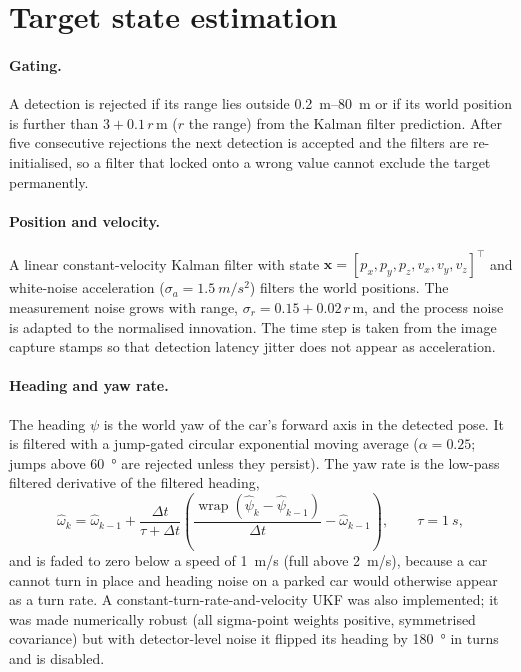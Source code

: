 \documentclass[11pt,a4paper]{report}
\begin{document}
\section{Target state estimation}
\label{sec:estimation}

\paragraph{Gating.}
A detection is rejected if its range lies outside \SIrange{0.2}{80}{m} or if its
world position is further than $3 + 0.1\,r$\,m ($r$ the range) from the Kalman
filter prediction. After five consecutive rejections the next detection is
accepted and the filters are re-initialised, so a filter that locked onto a
wrong value cannot exclude the target permanently.

\paragraph{Position and velocity.}
A linear constant-velocity Kalman filter with state
$\mathbf{x}=[p_x,p_y,p_z,v_x,v_y,v_z]^\top$ and white-noise acceleration
($\sigma_a=\SI{1.5}{m/s^2}$) filters the world positions. The measurement
noise grows with range, $\sigma_r = 0.15 + 0.02\,r$\,m, and the process noise is
adapted to the normalised innovation. The time step is taken from the image
capture stamps so that detection latency jitter does not appear as acceleration.

\paragraph{Heading and yaw rate.}
The heading $\psi$ is the world yaw of the car's forward axis in the detected pose.
It is filtered with a jump-gated circular exponential moving average
($\alpha=0.25$; jumps above \SI{60}{\degree} are rejected unless they persist).
The yaw rate is the low-pass filtered derivative of the filtered heading,
\begin{equation}
  \hat\omega_k = \hat\omega_{k-1} + \frac{\Delta t}{\tau+\Delta t}
  \left(\frac{\operatorname{wrap}(\hat\psi_k-\hat\psi_{k-1})}{\Delta t}-\hat\omega_{k-1}\right),
  \qquad \tau = \SI{1}{s},
\end{equation}
and is faded to zero below a speed of \SI{1}{m/s} (full above \SI{2}{m/s}),
because a car cannot turn in place and heading noise on a parked car would
otherwise appear as a turn rate. A constant-turn-rate-and-velocity UKF was also
implemented; it was made numerically robust (all sigma-point weights positive,
symmetrised covariance) but with detector-level noise it flipped its heading by
\SI{180}{\degree} in turns and is disabled.
\end{document}
